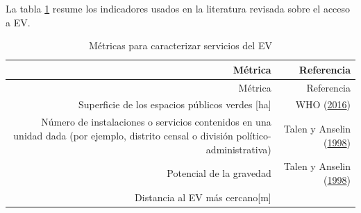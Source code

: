 \documentclass[12pt,a4paper,openany]{book}
\theoremstyle{definition}
\theoremstyle{definition}
\theoremstyle{definition}
\theoremstyle{remark}
\begin{document}
La tabla \ref{tab:ind-EV} resume los indicadores usados en la literatura
revisada sobre el acceso a EV.

\begin{longtable}[]{@{}rr@{}}
\caption{\label{tab:ind-EV} Métricas para caracterizar servicios del
EV}\tabularnewline
\toprule
\begin{minipage}[b]{0.57\columnwidth}\raggedleft\strut
Métrica\strut
\end{minipage} & \begin{minipage}[b]{0.31\columnwidth}\raggedleft\strut
Referencia\strut
\end{minipage}\tabularnewline
\midrule
\endfirsthead
\toprule
\begin{minipage}[b]{0.57\columnwidth}\raggedleft\strut
Métrica\strut
\end{minipage} & \begin{minipage}[b]{0.31\columnwidth}\raggedleft\strut
Referencia\strut
\end{minipage}\tabularnewline
\midrule
\endhead
\begin{minipage}[t]{0.57\columnwidth}\raggedleft\strut
Superficie de los espacios públicos verdes {[}ha{]}\strut
\end{minipage} & \begin{minipage}[t]{0.31\columnwidth}\raggedleft\strut
WHO (\protect\hyperlink{ref-who2016urban}{2016})\strut
\end{minipage}\tabularnewline
\begin{minipage}[t]{0.57\columnwidth}\raggedleft\strut
Número de instalaciones o servicios contenidos en una unidad dada (por
ejemplo, distrito censal o división político-administrativa)\strut
\end{minipage} & \begin{minipage}[t]{0.31\columnwidth}\raggedleft\strut
Talen y Anselin
(\protect\hyperlink{ref-talen_assessing_1998}{1998})\strut
\end{minipage}\tabularnewline
\begin{minipage}[t]{0.57\columnwidth}\raggedleft\strut
Potencial de la gravedad\strut
\end{minipage} & \begin{minipage}[t]{0.31\columnwidth}\raggedleft\strut
Talen y Anselin
(\protect\hyperlink{ref-talen_assessing_1998}{1998})\strut
\end{minipage}\tabularnewline
\begin{minipage}[t]{0.57\columnwidth}\raggedleft\strut
Distancia al EV más cercano{[}m{]}\strut
\end{minipage} & \begin{minipage}[t]{0.31\columnwidth}\raggedleft\strut

\end{minipage}
\end{longtable}
\end{document}
